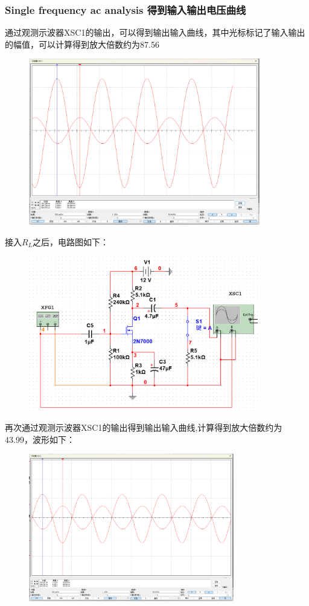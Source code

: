 \documentclass[a4paper,11pt,UTF8]{article}
\numberwithin{equation}{subsection}
\begin{document}
\subsubsection{Single frequency ac analysis 得到输入输出电压曲线}
通过观测示波器XSC1的输出，可以得到输出输入曲线，其中光标标记了输入输出的幅值，可以计算得到放大倍数约为87.56
\begin{figure}[H]
	\centering
	\includegraphics[width=0.9\textwidth]{2.6.PNG}	
\end{figure}
接入$R_L$之后，电路图如下：
\begin{figure}[H]
	\centering
	\includegraphics[width=0.9\textwidth]{6.1.2.PNG}	
\end{figure}
再次通过观测示波器XSC1的输出得到输出输入曲线,计算得到放大倍数约为43.99，波形如下：
\begin{figure}[H]
\centering
\includegraphics[width=0.8\textwidth]{VoR_L.PNG}	
\end{figure}
\end{document}
